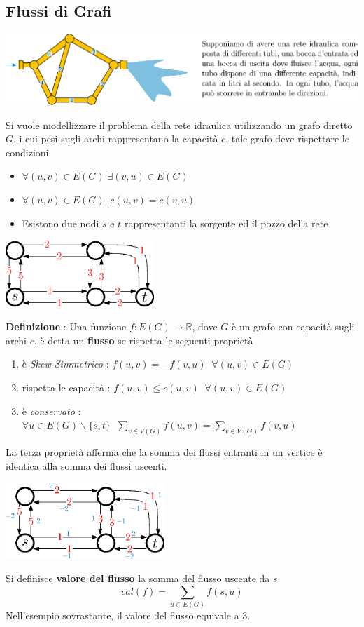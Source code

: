 \documentclass[12pt, letterpaper]{article}
\begin{document}
\subsection{Flussi di Grafi}
\begin{center}
    \includegraphics[width=1\textwidth ]{images/reteIdraulica.eps}
\end{center}
Si vuole modellizzare il problema della rete idraulica utilizzando un grafo diretto $G$, i cui pesi sugli archi 
rappresentano la capacità $c$, tale grafo deve rispettare le condizioni\begin{itemize}
    \item $\forall (u,v)\in E(G)\; \exists (v,u)\in E(G)$
    \item $\forall (u,v)\in E(G)\;\;c(u,v)=c(v,u)$
    \item Esistono due nodi $s$ e $t$ rappresentanti la sorgente ed il pozzo della rete
\end{itemize}\begin{center}
    \includegraphics[width=0.42\textwidth ]{images/grafoCapacita.eps}
\end{center}
\textbf{Definizione} : Una funzione $f:E(G)\rightarrow \mathbb{R}$, dove $G$ è un grafo 
con capacità sugli archi $c$, è detta un \textbf{flusso} se rispetta le seguenti proprietà\begin{enumerate}
    \item è \textit{Skew-Simmetrico} : $f(u,v)=-f(v,u)\;\;\forall (u,v)\in E(G)$
    \item rispetta le capacità : $f(u,v)\le c(u,v)\;\;\forall (u,v)\in E(G)$
    \item è \textit{conservato} : $\forall u\in E(G)\backslash\{s,t\}\;\; 
    \displaystyle \sum_{v\in V(G)}f(u,v)=\sum_{v\in V(G)}f(v,u)$
\end{enumerate}
La terza proprietà afferma che la somma dei flussi entranti in un vertice è identica alla somma dei flussi 
uscenti.\begin{center}
    \includegraphics[width=0.45\textwidth ]{images/flusso.eps}
\end{center}
Si definisce \textbf{valore del flusso} la somma del flusso uscente da $s$ 
$$val(f)=\sum_{u\in E(G)}f(s,u) $$
Nell'esempio sovrastante, il valore del flusso equivale a 3.
\end{document}
